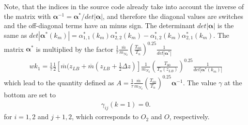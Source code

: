 %
Note, that the indices in the source code already take into account
the inverse of the matrix with $\mathbf{\alpha}^{-1} =
\mathbf{\alpha}^*/det|\mathbf{\alpha}| $, and therefore the diagonal
values are switches and the off-diagonal terms have an minus sign.
The determinant $det|\mathbf{\alpha}|$ is the same as
$det|\mathbf{\alpha}^*(k_m)|=
\alpha^*_{1,1}(k_m)\alpha^*_{2,2}(k_m)-\alpha^*_{1,2}(k_m)\alpha^*_{2,1}(k_m)$.
The matrix $\mathbf{\alpha}^{*}$ is multiplied by the factor
$\frac{1}{\tau} \frac{\overline{m}}{m_{N_2}}\left(
\frac{T_{00}}{T_n}\right)^{0.25}\frac{1}{det|\mathbf{\alpha}^*|}$
%
\begin{align}
   wk_1 = \frac{1}{\tau}\frac{1}{2} [\overline{m}(z_{LB}+ \overline{m}(z_{LB}+\frac{1}{2}\Delta z)]
   \frac{1}{m_{N_2}}\left(
\frac{T_{00}}{T_n(z_{LB})}\right)^{0.25}\frac{1}{det|\mathbf{\alpha}^*(k_m)|}
\end{align}
%
 which lead to the quantity defined as $A = \frac{1}{\tau} \frac{\overline{m}}{m_{N_2}}\left(
\frac{T_{00}}{T_n}\right)^{0.25}\mathbf{\alpha}^{-1}$. The value
$\gamma$ at the bottom are set to
%
\begin{align}
  \gamma_{ij}(k=1) = 0.
\end{align}
%
for $i = 1, 2$ and $j+ 1, 2$, which corresponds to $O_2$ and $O$,
respectively. \\

